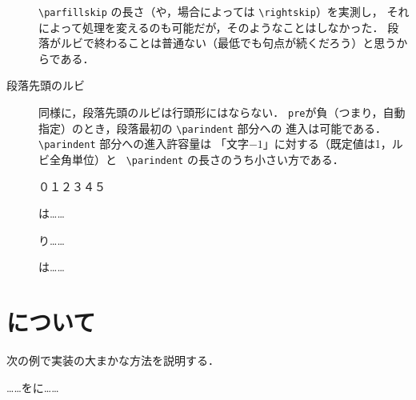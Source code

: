 \documentclass[a4paper,10pt]{ltjsarticle}
\begin{document}
\begin{description}
\verb+\parfillskip+ の長さ（や，場合によっては \verb+\rightskip+）を実測し，
それによって処理を変えるのも可能だが，そのようなことはしなかった．
段落がルビで終わることは普通ない（最低でも句点が続くだろう）と思うからである．



\item[段落先頭のルビ]
同様に，段落先頭のルビは行頭形にはならない．
\texttt{pre}が負（つまり，自動指定）のとき，段落最初の \verb+\parindent+ 部分への
進入は可能である．\verb+\parindent+ 部分への進入許容量は
「文字$-1$」に対する（既定値は1，ルビ全角単位）と
\ \verb+\parindent+ の長さのうち小さい方である．
\begin{LTXexample}[preset=\Large,width=0.4\textwidth]
\zw\noindent ０１２３４５\par
{}は……\par
{}り……\par
{}\zw{}は……
\end{LTXexample}


\end{description}

\newpage
\section{について}
\label{sec:impl}
次の例で実装の大まかな方法を説明する．
\begin{LTXexample}[preset=\Large]
……をに……
\end{LTXexample}
\end{document}
